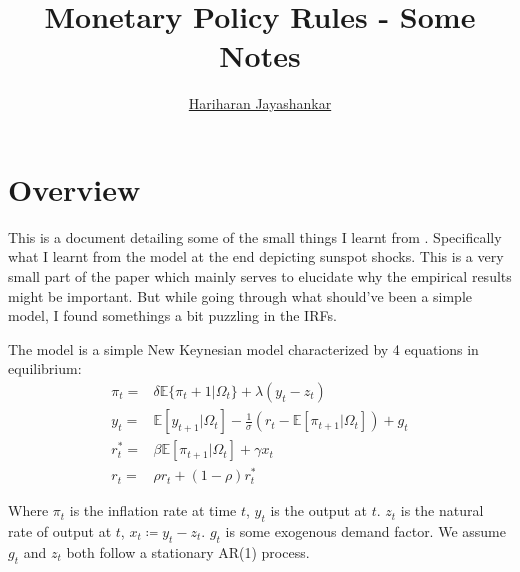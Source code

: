 \documentclass[a4paper 12pt]{article}
\title{Monetary Policy Rules - Some Notes}
\author{\href{https://hariharanjayashankar.github.io/}{Hariharan Jayashankar}}
\begin{document}
\maketitle

\section{Overview}

This is a document detailing some of the small things I learnt from \citet{clarida2000}. Specifically what I learnt from the model at the end depicting sunspot shocks. This is a very small part of the paper which mainly serves to elucidate why the empirical results might be important. But while going through what should've been a simple model, I found somethings a bit puzzling in the IRFs.

The model is a simple New Keynesian model characterized by 4 equations in equilibrium:
\begin{align}
\pi_t =& \delta \mathbb{E}\{\pi{_t+1} | \Omega_t\} + \lambda (y_t - z_t) \\
y_t =& \mathbb{E}[y_{t+1} | \Omega_t] - \frac{1}{\sigma}(r_t - \mathbb{E}[\pi_{t+1} | \Omega_t]) + g_t \\
r_t^* =& \beta \mathbb{E}[\pi_{t+1} | \Omega_t] + \gamma x_t \\
r_t =& \rho r_t + (1 - \rho) r_t^*
\end{align}

Where $\pi_t$ is the inflation rate at time $t$, $y_t$ is the output at $t$. $z_t$ is the natural rate of output at $t$, $x_t \coloneqq y_t - z_t$. $g_t$ is some exogenous demand factor. We assume $g_t$ and $z_t$ both follow a stationary AR(1) process.




\end{document}
